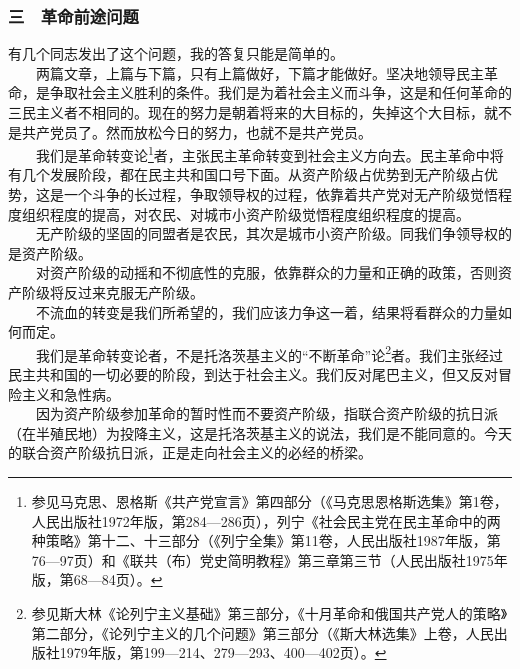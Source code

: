 \documentclass[cn,11pt,chinese]{elegantbook}
\def\myformat#1{\hfil\hfil #1}
\begin{document}
\subsubsection*{\myformat{三　革命前途问题 }}
有几个同志发出了这个问题，我的答复只能是简单的。\\
　　两篇文章，上篇与下篇，只有上篇做好，下篇才能做好。坚决地领导民主革命，是争取社会主义胜利的条件。我们是为着社会主义而斗争，这是和任何革命的三民主义者不相同的。现在的努力是朝着将来的大目标的，失掉这个大目标，就不是共产党员了。然而放松今日的努力，也就不是共产党员。\\
　　我们是革命转变论\footnote[11]{ 参见马克思、恩格斯《共产党宣言》第四部分（《马克思恩格斯选集》第1卷，人民出版社1972年版，第284—286页），列宁《社会民主党在民主革命中的两种策略》第十二、十三部分（《列宁全集》第11卷，人民出版社1987年版，第76—97页）和《联共（布）党史简明教程》第三章第三节（人民出版社1975年版，第68—84页）。}者，主张民主革命转变到社会主义方向去。民主革命中将有几个发展阶段，都在民主共和国口号下面。从资产阶级占优势到无产阶级占优势，这是一个斗争的长过程，争取领导权的过程，依靠着共产党对无产阶级觉悟程度组织程度的提高，对农民、对城市小资产阶级觉悟程度组织程度的提高。\\
　　无产阶级的坚固的同盟者是农民，其次是城市小资产阶级。同我们争领导权的是资产阶级。\\
　　对资产阶级的动摇和不彻底性的克服，依靠群众的力量和正确的政策，否则资产阶级将反过来克服无产阶级。\\
　　不流血的转变是我们所希望的，我们应该力争这一着，结果将看群众的力量如何而定。\\
　　我们是革命转变论者，不是托洛茨基主义的“不断革命”论\footnote[12]{ 参见斯大林《论列宁主义基础》第三部分，《十月革命和俄国共产党人的策略》第二部分，《论列宁主义的几个问题》第三部分（《斯大林选集》上卷，人民出版社1979年版，第199—214、279—293、400—402页）。}者。我们主张经过民主共和国的一切必要的阶段，到达于社会主义。我们反对尾巴主义，但又反对冒险主义和急性病。\\
　　因为资产阶级参加革命的暂时性而不要资产阶级，指联合资产阶级的抗日派（在半殖民地）为投降主义，这是托洛茨基主义的说法，我们是不能同意的。今天的联合资产阶级抗日派，正是走向社会主义的必经的桥梁。\\
\end{document}
